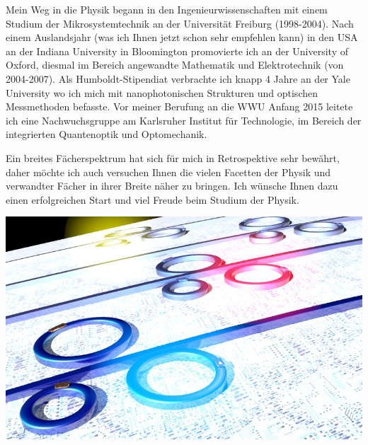 \begin{multicols}{2}
Mein Weg in die Physik begann in den Ingenieurwissenschaften mit einem Studium der Mikrosystemtechnik an der Universität Freiburg (1998-2004). Nach einem Auslandsjahr (was ich Ihnen jetzt schon sehr empfehlen kann) in den USA an der Indiana University in Bloomington promovierte ich an der University of Oxford, diesmal im Bereich angewandte Mathematik und Elektrotechnik (von 2004-2007). Als Humboldt-Stipendiat verbrachte ich knapp 4 Jahre an der Yale University wo ich mich mit nanophotonischen Strukturen und optischen Messmethoden befasste. Vor meiner Berufung an die WWU Anfang 2015 leitete ich eine Nachwuchsgruppe am Karlsruher Institut für Technologie, im Bereich der integrierten Quantenoptik und Optomechanik.

Ein breites Fächerspektrum hat sich für mich in Retrospektive sehr bewährt, daher möchte ich auch versuchen Ihnen die vielen Facetten der Physik und verwandter Fächer in ihrer Breite näher zu bringen. Ich wünsche Ihnen dazu einen erfolgreichen Start und viel Freude beim Studium der Physik.

\includegraphics[width=\columnwidth]{res/pernice_illustration.jpg}
\end{multicols}

\newpage

